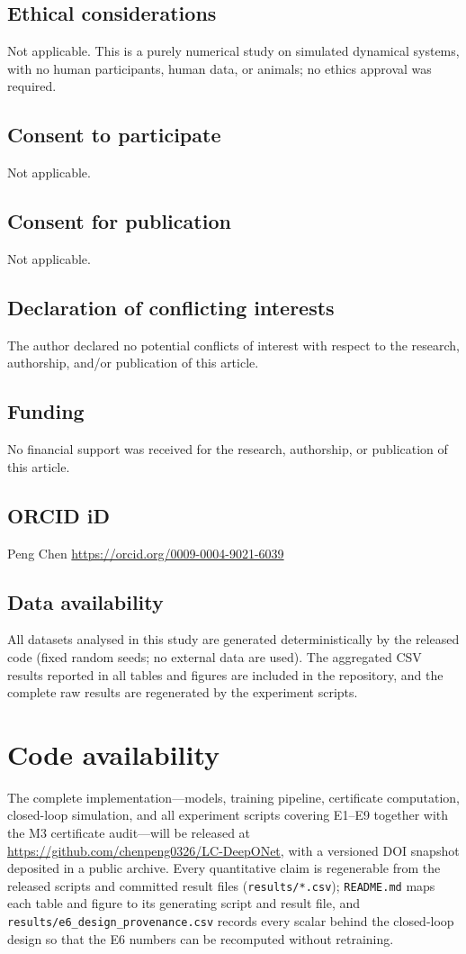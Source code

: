 \documentclass[11pt]{article}
\begin{document}
\subsection*{Ethical considerations}
Not applicable. This is a purely numerical study on simulated dynamical
systems, with no human participants, human data, or animals; no ethics
approval was required.

\subsection*{Consent to participate}
Not applicable.

\subsection*{Consent for publication}
Not applicable.

\subsection*{Declaration of conflicting interests}
The author declared no potential conflicts of interest with respect to the
research, authorship, and/or publication of this article.

\subsection*{Funding}
No financial support was received for the research, authorship, or
publication of this article.

\subsection*{ORCID iD}
Peng Chen \url{https://orcid.org/0009-0004-9021-6039}

\subsection*{Data availability}
All datasets analysed in this study are generated deterministically by the
released code (fixed random seeds; no external data are used). The aggregated
CSV results reported in all tables and figures are included in the repository,
and the complete raw results are regenerated by the experiment scripts.

\section*{Code availability}
The complete implementation---models, training pipeline, certificate
computation, closed-loop simulation, and all experiment scripts covering
E1--E9 together with the M3 certificate audit---will be released at
\url{https://github.com/chenpeng0326/LC-DeepONet}, with a versioned DOI
snapshot deposited in a public archive. Every quantitative claim is
regenerable from the released scripts and committed result files
(\texttt{results/*.csv}); \texttt{README.md} maps each table and figure to
its generating script and result file, and
\texttt{results/e6\_design\_provenance.csv} records every scalar behind the
closed-loop design so that the E6 numbers can be recomputed without
retraining.
\end{document}
